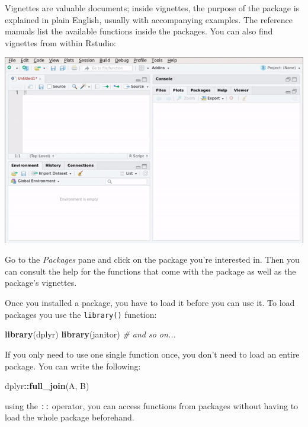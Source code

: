 \documentclass[]{gitbook}
\newenvironment{Shaded}{\begin{snugshade}}{\end{snugshade}}
\newcommand{\CommentTok}[1]{\textcolor[rgb]{0.56,0.35,0.01}{\textit{#1}}}
\newcommand{\KeywordTok}[1]{\textcolor[rgb]{0.13,0.29,0.53}{\textbf{#1}}}
\newcommand{\NormalTok}[1]{#1}
\newcommand{\OperatorTok}[1]{\textcolor[rgb]{0.81,0.36,0.00}{\textbf{#1}}}
\theoremstyle{definition}
\theoremstyle{definition}
\theoremstyle{definition}
\theoremstyle{remark}
\begin{document}
Vignettes are valuable documents; inside vignettes, the purpose of the
package is explained in plain English, usually with accompanying
examples. The reference manuals list the available functions inside the
packages. You can also find vignettes from within Rstudio:

\includegraphics{pics/rstudio_vignette.gif}

Go to the \emph{Packages} pane and click on the package you're
interested in. Then you can consult the help for the functions that come
with the package as well as the package's vignettes.

Once you installed a package, you have to load it before you can use it.
To load packages you use the \texttt{library()} function:

\begin{Shaded}
\begin{Highlighting}[]
\KeywordTok{library}\NormalTok{(dplyr)}
\KeywordTok{library}\NormalTok{(janitor)}
\CommentTok{# and so on...}
\end{Highlighting}
\end{Shaded}

If you only need to use one single function once, you don't need to load
an entire package. You can write the following:

\begin{Shaded}
\begin{Highlighting}[]
\NormalTok{dplyr}\OperatorTok{::}\KeywordTok{full_join}\NormalTok{(A, B)}
\end{Highlighting}
\end{Shaded}

using the \texttt{::} operator, you can access functions from packages
without having to load the whole package beforehand.
\end{document}
